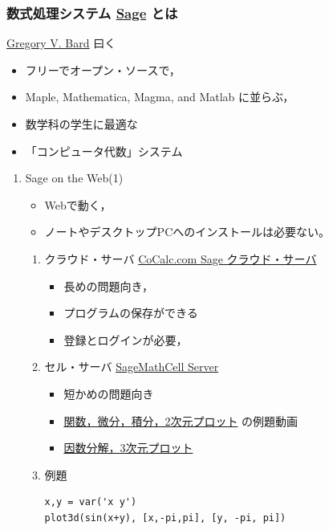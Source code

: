 \documentclass[dvipdfmx,11pat]{jarticle}
\begin{document}
\subsubsection{数式処理システム \href{http://www.sagemath.org}{Sage} とは}
\label{sec:orgbf17906}
\href{http://www.gregorybard.com/Sage.html}{Gregory V. Bard} 曰く
\begin{itemize}
\item フリーでオープン・ソースで，
\item Maple, Mathematica, Magma, and Matlab に並らぶ，
\item 数学科の学生に最適な
\item 「コンピュータ代数」システム
\end{itemize}
\begin{enumerate}
\item Sage on the Web(1)
\label{sec:org1b32611}
\begin{itemize}
\item Webで動く，
\item ノートやデスクトップPCへのインストールは必要ない。
\end{itemize}
\begin{enumerate}
\item クラウド・サーバ
\label{sec:orgdf9c8cb}
\href{http://www.cocalc.com/}{CoCalc.com Sage クラウド・サーバ} 
\begin{itemize}
\item 長めの問題向き，
\item プログラムの保存ができる
\item 登録とログインが必要，
\end{itemize}
\item セル・サーバ
\label{sec:orgea49f48}
\href{http://sagecell.sagemath.org/}{SageMathCell Server}
\begin{itemize}
\item 短かめの問題向き
\item \href{http://www.gregorybard.com/videos/Sage\_part1.swf}{関数，微分，積分，2次元プロット} の例題動画
\item \href{http://www.gregorybard.com/videos/Sage\_part2.swf}{因数分解，3次元プロット}
\end{itemize}
\item 例題
\label{sec:org28f63a5}
\begin{verbatim}
x,y = var('x y')
plot3d(sin(x+y), [x,-pi,pi], [y, -pi, pi])
\end{verbatim}


\end{enumerate}
\end{enumerate}
\end{document}
